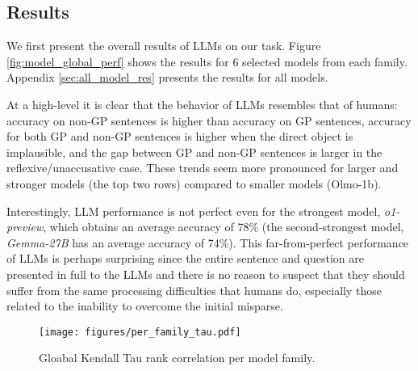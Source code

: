 \subsection{Results}

We first present the overall results of LLMs on our task.  Figure \ref{fig:model_global_perf} shows the results for 6 selected models from each family. Appendix \ref{sec:all_model_res} presents the results for all models.

At a high-level it is clear that the behavior of LLMs resembles that of humans: accuracy on non-GP sentences is higher than accuracy on GP sentences, accuracy for both GP and non-GP sentences is higher when the direct object is implausible, and the gap between GP and non-GP sentences is larger in the reflexive/unaccusative case. These trends seem more pronounced for larger and stronger models (the top two rows) compared to smaller models (Olmo-1b).


Interestingly, LLM performance is not perfect even for the strongest model, \emph{o1-preview}, which obtains an average accuracy of 78\% (the second-strongest model, \emph{Gemma-27B} has an average accuracy of 74\%). 
This far-from-perfect performance of LLMs is perhaps surprising since the entire sentence and question are presented in full to the LLMs and there is no reason to  suspect that they should suffer from the same processing difficulties that humans do, especially those related to the inability to overcome the initial misparse.




\begin{figure}[t!]
    \centering
    \scriptsize
    \texttt{[image: figures/per\_family\_tau.pdf]}
    \caption{Gloabal Kendall Tau rank correlation per model family.}
    \label{fig:kendall_tau_global}
\end{figure}


